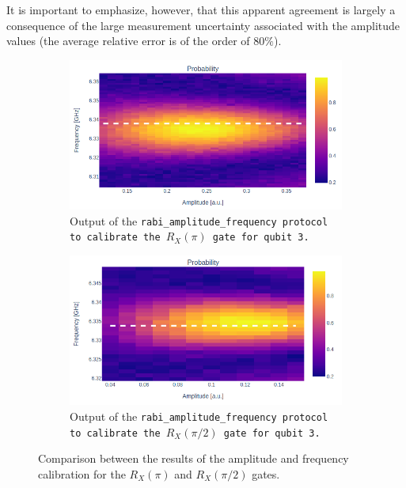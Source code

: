 It is important to emphasize, however, that this apparent agreement is largely a consequence of the large measurement uncertainty associated with the amplitude values (the average relative error is of the order of $80\%$).

\begin{figure}[h!]
    \centering
    \begin{subfigure}[t]{0.495\textwidth}
        \includegraphics[width=\textwidth]{figures/png/RX90/RabiAmplitudeFrequency/RX.png}
        \caption{Output of the \tt{rabi\_amplitude\_frequency} protocol to calibrate the $R_X(\pi)$ gate for qubit \tt{3}.}
        \label{fig:RX_3}
    \end{subfigure}
    \hfill
    \begin{subfigure}[t]{0.495\textwidth}
        \includegraphics[width=\textwidth]{figures/png/RX90/RabiAmplitudeFrequency/RX90.png}
        \caption{Output of the \tt{rabi\_amplitude\_frequency} protocol to calibrate the $R_X(\pi/2)$ gate for qubit \tt{3}.}
        \label{fig:RX90_30}
    \end{subfigure}
    \caption{Comparison between the results of the amplitude and frequency calibration for the $R_X(\pi)$ and $R_X(\pi/2)$ gates.}
    \label{fig:af_qw5q}
\end{figure}

